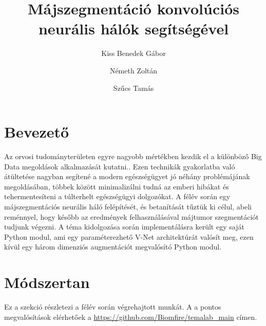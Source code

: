 \documentclass[a4paper]{article}
\title{Májszegmentáció \linebreak konvolúciós neurális hálók segítségével}
\author{Kiss Benedek Gábor\and Németh Zoltán\and Szűcs Tamás }
\begin{document}
	\maketitle
	\tableofcontents
	\section*{Bevezető}
	Az orvosi tudományterületen egyre nagyobb mértékben kezdik el a különböző Big Data megoldások alkalmazását kutatni.\cite{2019arXiv190903029S}. Ezen technikák gyakorlatba való átültetése nagyban segítené a modern egészségügyet jó néhány problémájának megoldásában, többek között minimalizálni tudná az emberi hibákat és tehermentesíteni a túlterhelt egészségügyi dolgozókat. A félév során egy májszegmentációs neurális háló felépítését, és betanítását tűztük ki célul, abeli reménnyel, hogy később az eredmények felhasználásával májtumor szegmentációt tudjunk végezni. A téma kidolgozása során implementálásra került egy saját Python modul, ami egy paraméterezhető V-Net architektúrát valósít meg, ezen kívül egy három dimenziós augmentációt megvalósító Python modul.
	\pagebreak
	\section{Módszertan}
	Ez a szekció részletezi a félév során végrehajtott munkát. A  a pontos megvalósítások elérhetőek a \url{https://github.com/Biomfire/temalab_main} címen.\\
\end{document}
